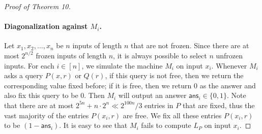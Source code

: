 \begin{proof}[Proof of Theorem 10]
\paragraph{Diagonalization against $M_i$.}
Let $x_1,x_2,\ldots,x_n$ be $n$ inputs of length $n$ that are not frozen. Since there are at most $2^{n/2}$ frozen inputs of length $n$, it is always possible to select $n$ unfrozen inputs. For each $i\in[n]$, we simulate the machine $M_i$ on input $x_i$. Whenever $M_i$ asks a query $P(x,r)$ or $Q(r)$, if this query is not free, then we return the corresponding value fixed before; if it is free, then we return $0$ as the answer and also fix this query to be $0$. Then $M_i$ will output an answer $\mathsf{ans}_i\in\{0,1\}$. Note that there are at most $2^{5n}+n\cdot2^n\ll2^{100n}/3$ entries in $P$ that are fixed, thus the vast majority of the entries $P(x_i,r)$ are free. We fix all these entries $P(x_i,r)$ to be $(1-\mathsf{ans}_i)$. It is easy to see that $M_i$ fails to compute $L_P$ on input $x_i$.

\end{proof}
